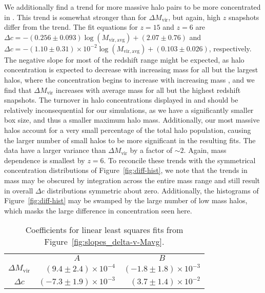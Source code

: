 We additionally find a trend for more massive halo pairs to be more concentrated in \za.  This trend is somewhat stronger than for $\Delta M_{\mathrm{vir}}$, but again, high $z$ snapshots differ from the trend.  The fit equations for $z = 15$ and $z = 6$ are $\Delta c = -(0.256 \pm 0.093) \log(M_{\mathrm{vir,avg}}) + (2.07 \pm 0.76)$ and $\Delta c = -(1.10 \pm 0.31) \times 10^{-2} \log(M_{\mathrm{vir,avg}}) + (0.103 \pm 0.026)$, respectively.  The negative slope for most of the redshift range might be expected, as halo concentration is expected to decrease with increasing mass for all but the largest halos, where the concentration begins to increase with increasing mass \citep{2011ApJ...740..102K, 2012MNRAS.423.3018P}, and we find that $\Delta M_{\mathrm{vir}}$ increases with average mass for all but the highest redshift snapshots.  The turnover in halo concentrations displayed in \citet{2011ApJ...740..102K} and \citet{2012MNRAS.423.3018P} should be relatively inconsequential for our simulations, as we have a significantly smaller box size, and thus a smaller maximum halo mass.  Additionally, our most massive halos account for a very small percentage of the total halo population, causing the larger number of small halos to be more significant in the resulting fits.  The data have a larger variance than $\Delta M_{\mathrm{vir}}$ by a factor of $\sim 2$.  Again, mass dependence is smallest by $z = 6$.  To reconcile these trends with the symmetrical concentration distributions of Figure~\ref{fig:diff-hist}, we note that the trends in mass may be obscured by integration across the entire mass range and still result in overall $\Delta c$ distributions symmetric about zero.  Additionally, the histograms of Figure~\ref{fig:diff-hist} may be swamped by the large number of low mass halos, which masks the large difference in concentration seen here.

\begin{table}[t]
	\centering
	\caption{Coefficients for linear least squares fits from Figure~\ref{fig:slopes_delta-v-Mavg}.}
	\begin{tabular}{ c  r  r }
		\toprule
		                           &  \multicolumn{1}{c}{$A$}            &  \multicolumn{1}{c}{$B$} \\
		\cmidrule(l){2-3}
		$\Delta M_{\mathrm{vir}}$  &   $(9.4 \pm 2.4) \times 10^{-4}$  &  $(-1.8 \pm 1.8) \times 10^{-3}$ \\
		$\Delta c$                 &  $(-7.3 \pm 1.9) \times 10^{-3}$  &   $(3.7 \pm 1.4) \times 10^{-2}$ \\
		\bottomrule
	\end{tabular}
	\label{tab:coeffs_slopes}
\end{table}

